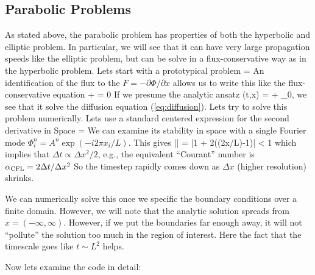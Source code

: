 \subsection{Parabolic Problems}

As stated above, the parabolic problem has properties of both the hyperbolic and elliptic problem.  In particular, we will see that it can have very large propagation speeds like the elliptic problem, but can be solve in a flux-conservative way as in the hyperbolic problem.  Lets start with a prototypical problem
\be
\ddt{\Phi} = \dddx{\Phi}\label{eq:diffusion}
\ee
An identification of the flux to the $F = -\partial\Phi/\partial x$ allows us to write this like the flux-conservative equation
\be
\ddt{\Phi} +  = 0
\ee
If we presume the analytic ansatz
\be
\Phi(t,x) =  + \Phi_0,
\ee
we see that it solve the diffusion equation (\ref{eq:diffusion}).  Lets try to solve this problem numerically.  Lets use a standard centered expression for the second derivative in Space
\be
{} = 
\ee
We can examine its stability in space with a single Fourier mode $\Phi_i^n = A^n\exp(-i2\pi x_i/L)$.  This gives
\be
\left|\right| = \left|1 + 2\left(\cos(2\pi\Delta x/L)-1\right)\right| < 1
\ee
which implies that $\Delta t \propto \Delta x^2/2$, e.g., the equivalent ``Courant'' number is $\alpha_{\rm CFL} = 2\Delta t/\Delta x^2$  So the timestep rapidly comes down as $\Delta x$ (higher resolution) shrinks.  

We can numerically solve this once we specific the boundary conditions over a finite domain.  However, we will note that the analytic solution spreads from $x=(-\infty,\infty)$.  However, if we put the boundaries far enough away, it will not ``pollute'' the solution too much in the region of interest.  Here the fact that the timescale goes like $t\sim L^2$ helps. 

Now lets examine the code in detail:





